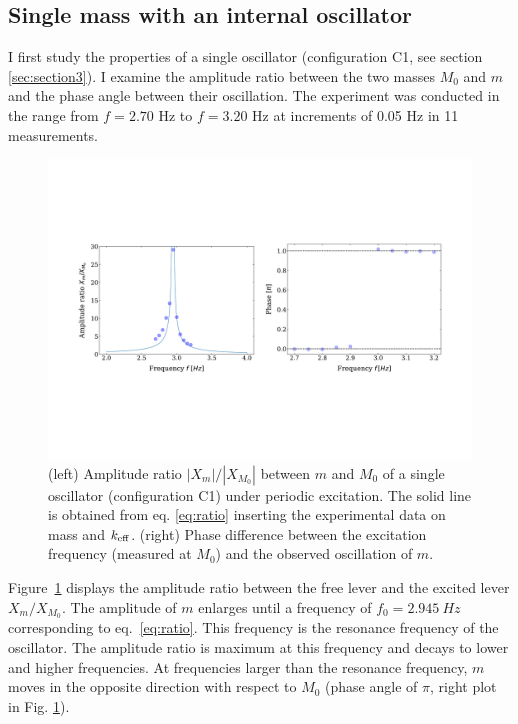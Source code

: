 \documentclass[12pt]{article}
\begin{document}
\subsection{Single mass with an internal oscillator}
I first study the properties of a single oscillator (configuration C1, see section \ref{sec:section3}). I examine the amplitude ratio between the two masses $M_0$ and $m$ and the phase angle between their oscillation. The experiment was conducted in the range from $f=2.70$ Hz to $f=3.20$ Hz at increments of 0.05 Hz in 11 measurements. 
\begin{figure}[hbt]
  \includegraphics[width=0.9\columnwidth]{condition3_amplitude_ratio}
  \caption{(left) Amplitude ratio $|X_m|/|X_{M_0}|$ between $m$ and $M_0$ of a single oscillator (configuration C1) under periodic excitation. The solid line is obtained from eq. \ref{eq:ratio} inserting the experimental data on mass and $k_{\rm eff}$. (right) Phase difference between the excitation frequency (measured at $M_{0}$) and the observed oscillation of $m$.} \label{fig:figure17}
\end{figure}
Figure~\ref{fig:figure17} displays the amplitude ratio between the free lever and the excited  lever $X_{m}/X_{M_{0}}$. The amplitude of $m$ enlarges until a frequency of $f_{0}=2.945 \:Hz$ corresponding to eq.~\ref{eq:ratio}. This frequency is the resonance frequency of the oscillator. The amplitude ratio is maximum at this frequency and decays to lower and higher frequencies. At frequencies larger than the resonance frequency, $m$  moves in the opposite direction with respect to $M_0$ (phase angle of $\pi$, right plot in Fig. \ref{fig:figure17}). 
\end{document}
